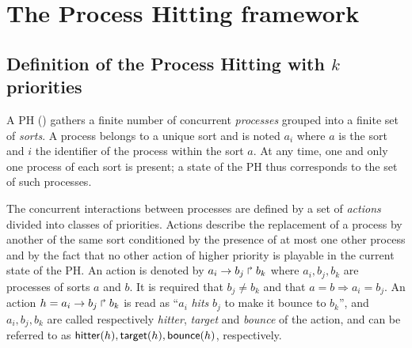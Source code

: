 \section{The Process Hitting framework}


\subsection{Definition of the Process Hitting with $k$ priorities}
\label{ssec:PH}
A PH () gathers a finite number of concurrent \emph{processes} grouped into a finite set of \emph{sorts}.
A process belongs to a unique sort and is noted $a_i$ where $a$ is the sort and $i$ the identifier of the process within the sort $a$.
At any time, one and only one process of each sort is present; a state of the PH thus corresponds to the set of such processes.

The concurrent interactions between processes are defined by a set of \emph{actions} divided into classes of priorities.
Actions describe the replacement of a process by another of the same sort conditioned by the presence of at most one other process and by the fact that no other action of higher priority is playable in the current state of the PH.
An action is denoted by $a_i\rightarrow b_j\Rsh b_k$ where $a_i,b_j,b_k$ are processes of sorts $a$ and $b$.
It is required that $b_j \neq b_k$ and that $a=b\Rightarrow a_i=b_j$.
An action $h=a_i\rightarrow b_j\Rsh b_k$ is read as ``$a_i$ \emph{hits} $b_j$ to make it bounce to $b_k$'', and $a_i,b_j,b_k$ are called respectively \emph{hitter}, \emph{target} and \emph{bounce} of the action, and can be referred to as $\mathsf{hitter}(h), \mathsf{target}(h), \mathsf{bounce}(h)$, respectively.

\begin{comment}
\begin{definition}[Process Hitting]\label{def:PH}
A \emph{Process Hitting} is a triple $(\PHs,\PHl,\PHa)$:
\begin{itemize}
\item $\PHs \DEF \{a,b,\dots\}$ is the finite set of \emph{sorts};
\item $\PHl \DEF \prod_{a\in\PHs} \PHl_a$ is the set of states with $\PHl_a = \{a_0,\dots,a_{l_a}\}$
the finite set of \emph{processes} of sort $a\in\Sigma$ and $l_a$ a positive integer with
	$a\neq b\Rightarrow \forall(a_i,b_j)\in\PHl_a\times\PHl_b,a_i\neq b_j$;
\item $\PHa \DEF \{ \PHfrappe{a_i}{b_j}{b_k}, \dots \mid
					(a,b)\in\PHs^2 \wedge (a_i,b_j,b_k)\in \PHl_a\times\PHl_b\times\PHl_b$ \\
	\hspace*{2cm} $\wedge b_j\neq b_k \wedge a=b\Rightarrow a_i=b_j\}$
			is the finite set of \emph{actions}.
\end{itemize}
$\PHproc$ denotes the set of all processes ($\PHproc \DEF \{ a_i\mid a\in\PHs \wedge a_i\in\PHl_a\}$).
\end{definition}
\end{comment}


